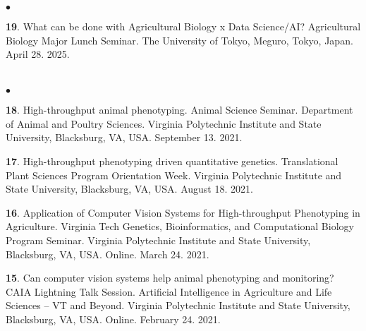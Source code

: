 \documentclass[margin,line,10pt]{res}
\newenvironment{list2}{
  \begin{list}{$\bullet$}{%
      \setlength{\itemsep}{0in}
      \setlength{\parsep}{0in} \setlength{\parskip}{0in}
      \setlength{\topsep}{0in} \setlength{\partopsep}{0in} 
      \setlength{\leftmargin}{0.2in}}}{\end{list}}
\begin{document}
\begin{resume}
\section{}
\begin{list2}

  \item  [{\bf 19}.] What can be done with Agricultural Biology x Data Science/AI? Agricultural Biology Major Lunch Seminar. The University of Tokyo, Meguro, Tokyo, Japan. April 28. 2025. %

\end{list2}



\section{}
\begin{list2}

  \item  [{\bf 18}.] High-throughput animal phenotyping. Animal Science Seminar. Department of Animal and Poultry Sciences. Virginia Polytechnic Institute and State University, Blacksburg, VA, USA. September 13. 2021. 

    \vspace{0.5cm}


    \item [{\bf 17}.] High-throughput phenotyping driven quantitative genetics. Translational Plant Sciences Program Orientation Week. Virginia Polytechnic Institute and State University, Blacksburg, VA, USA. August 18. 2021.

          \vspace{0.5cm}

\item [{\bf 16}.] Application of Computer Vision Systems for High-throughput Phenotyping in Agriculture. Virginia Tech Genetics, Bioinformatics, and Computational Biology Program Seminar. Virginia Polytechnic Institute and State University, Blacksburg, VA, USA. Online. March 24. 2021.

  \vspace{0.5cm}


  \item [{\bf 15}.] Can computer vision systems help animal phenotyping and monitoring? CAIA Lightning Talk Session. Artificial Intelligence in Agriculture and Life Sciences – VT and Beyond. Virginia Polytechnic Institute and State University, Blacksburg, VA, USA. Online. February 24. 2021.
\end{list2}






\end{resume}
\end{document}
